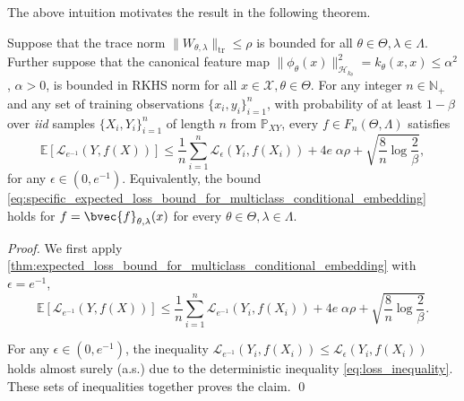 \documentclass[runningheads, envcountsame, a4paper]{llncs}
\begin{document}
			The above intuition motivates the result in the following theorem.
			
			\begin{theorem}
				\label{thm:specific_expected_loss_bound_for_multiclass_conditional_embedding}
				Suppose that the trace norm $\| W_{\theta, \lambda} \|_{\mathrm{tr}} \leq \rho$ is bounded for all $\theta \in \Theta, \lambda \in \Lambda$. Further suppose that the canonical feature map $\| \phi_{\theta}(x) \|_{\mathcal{H}_{k_{\theta}}}^{2} = k_{\theta}(x, x) \leq \alpha^{2}$, $\alpha > 0$, is bounded in \gls{RKHS} norm for all $x \in \mathcal{X}, \theta \in \Theta$. For any integer $n \in \mathbb{N}_{+}$ and any set of training observations $\{x_{i}, y_{i}\}_{i = 1}^{n}$, with probability of at least $1 - \beta$ over \textit{iid} samples $\{X_{i}, Y_{i}\}_{i = 1}^{n}$ of length $n$ from $\mathbb{P}_{X Y}$, every $f \in F_{n}(\Theta, \Lambda)$ satisfies
				\begin{equation}
					\mathbb{E}[\mathcal{L}_{e^{-1}}(Y, f(X))] \leq \frac{1}{n} \sum_{i = 1}^{n} \mathcal{L}_{\epsilon}(Y_{i}, f(X_{i})) + 4 e \; \alpha \rho + \sqrt{\frac{8}{n} \log{\frac{2}{\beta}}},
				\label{eq:specific_expected_loss_bound_for_multiclass_conditional_embedding}
				\end{equation}
				for any $\epsilon \in (0, e^{-1})$. Equivalently, the bound \eqref{eq:specific_expected_loss_bound_for_multiclass_conditional_embedding} holds for $f = \bvec{f}_{\theta, \lambda}(x)$ for every $\theta \in \Theta, \lambda \in \Lambda$.
			\end{theorem}
	
			\begin{proof}
				We first apply \cref{thm:expected_loss_bound_for_multiclass_conditional_embedding} with $\epsilon = e^{-1}$,
				\begin{equation}
					\mathbb{E}[\mathcal{L}_{e^{-1}}(Y, f(X))] \leq \frac{1}{n} \sum_{i = 1}^{n} \mathcal{L}_{e^{-1}}(Y_{i}, f(X_{i})) + 4 e \; \alpha \rho + \sqrt{\frac{8}{n} \log{\frac{2}{\beta}}}.
				\end{equation}
				
				For any $\epsilon \in (0, e^{-1})$, the inequality $\mathcal{L}_{e^{-1}}(Y_{i}, f(X_{i})) \leq \mathcal{L}_{\epsilon}(Y_{i}, f(X_{i}))$ holds almost surely (a.s.) due to the deterministic inequality \eqref{eq:loss_inequality}. These sets of inequalities together proves the claim.
				\qed
			\end{proof}
	
\end{document}
